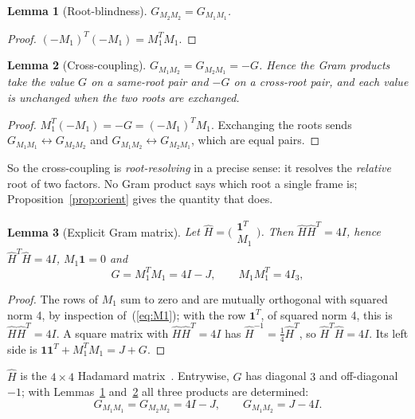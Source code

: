 \documentclass[twocolumn]{iopjournal}
\newtheorem{lemma}{Lemma}
\theoremstyle{definition}
\theoremstyle{remark}
\begin{document}
\begin{lemma}[Root-blindness]
\label{lem:blind}
$G_{M_2M_2} = G_{M_1M_1}$.
\end{lemma}

\begin{proof}
$(-M_1)^T(-M_1) = M_1^TM_1$.
\end{proof}

\begin{lemma}[Cross-coupling]
\label{lem:cross}
$G_{M_1M_2} = G_{M_2M_1} = -G$. Hence the Gram products take the
value $G$ on a same-root pair and $-G$ on a cross-root pair, and each
value is unchanged when the two roots are exchanged.
\end{lemma}

\begin{proof}
$M_1^T(-M_1) = -G = (-M_1)^TM_1$. Exchanging the roots sends
$G_{M_1M_1} \leftrightarrow G_{M_2M_2}$ and
$G_{M_1M_2} \leftrightarrow G_{M_2M_1}$, which are equal pairs.
\end{proof}

\noindent
So the cross-coupling is \emph{root-resolving} in a precise sense: it
resolves the \emph{relative} root of two factors. No Gram product
says which root a single frame is; Proposition~\ref{prop:orient}
gives the quantity that does.

\begin{lemma}[Explicit Gram matrix]
\label{lem:explicit}
Let $\hat H = \bigl(\begin{smallmatrix}\mathbf{1}^T \\ M_1
\end{smallmatrix}\bigr)$. Then $\hat H\hat H^T = 4I$, hence
$\hat H^T\hat H = 4I$, $M_1\mathbf{1} = 0$ and
\begin{equation}
  G = M_1^TM_1 = 4I - J, \qquad M_1M_1^T = 4I_3,
  \label{eq:G}
\end{equation}
\end{lemma}

\begin{proof}
The rows of $M_1$ sum to zero and are mutually orthogonal with
squared norm 4, by inspection of~(\ref{eq:M1}); with the row
$\mathbf{1}^T$, of squared norm 4, this is $\hat H\hat H^T = 4I$.
A square matrix with $\hat H\hat H^T = 4I$ has
$\hat H^{-1} = \tfrac14\hat H^T$, so $\hat H^T\hat H = 4I$. Its
left side is $\mathbf{1}\mathbf{1}^T + M_1^TM_1 = J + G$.
\end{proof}

\noindent
$\hat H$ is the $4\times4$ Hadamard matrix~\cite{NelsonHadamard}.
Entrywise, $G$ has diagonal $3$ and off-diagonal $-1$; with
Lemmas~\ref{lem:blind} and~\ref{lem:cross} all three products are
determined:
\begin{equation}
  G_{M_1M_1} = G_{M_2M_2} = 4I - J, \qquad G_{M_1M_2} = J - 4I.
  \label{eq:three}
\end{equation}
\end{document}
